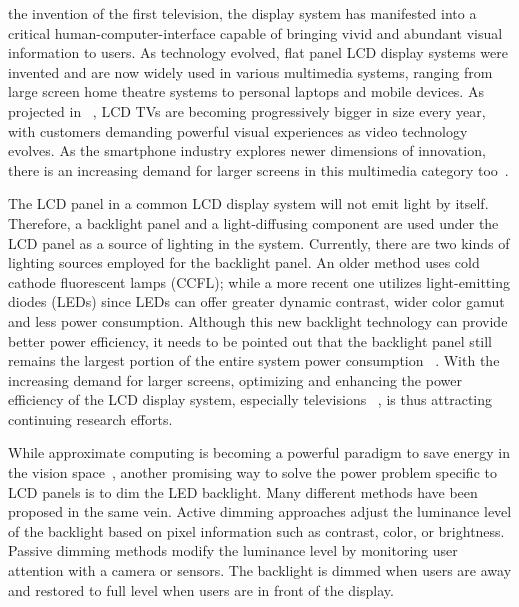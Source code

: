  the invention of the first television, the display system has manifested into a critical human-computer-interface 
capable of bringing vivid and abundant visual information to users. 
As technology evolved, flat panel LCD display systems were invented and are now 
widely used in various multimedia systems, ranging from large screen home theatre systems 
to personal laptops and mobile devices. As projected in ~\cite{lcd_future}, LCD TVs are becoming progressively bigger
in size every year, with customers demanding powerful visual experiences as video technology evolves. As the smartphone industry
explores newer dimensions of innovation, there is an increasing demand for larger screens in this multimedia category too~\cite{iPhone}.

The LCD panel in a common LCD display system will not emit light by itself. Therefore, a backlight panel and a light-diffusing 
component are used under the LCD panel as a source of lighting in the system.
Currently, there are two kinds of lighting sources employed for the backlight panel. 
An older method uses cold cathode fluorescent lamps (CCFL); while a more recent one utilizes 
light-emitting diodes (LEDs) since LEDs can offer greater dynamic contrast, wider color gamut and 
less power consumption. Although this new backlight technology can provide better power efficiency, 
it needs to be pointed out that the backlight panel still remains the largest portion of the entire 
system power consumption ~\cite{Sinofsky}. With the increasing demand for larger screens, 
optimizing and enhancing the power efficiency of the LCD display system, 
especially televisions ~\cite{Samsung}, is thus attracting continuing research efforts.

While approximate computing is becoming a powerful paradigm to save energy in the vision space~\cite{tvlsi2015}, 
another promising way to solve the power problem specific to LCD panels is to dim the LED backlight. Many different methods 
have been proposed in the same vein. Active dimming approaches adjust the luminance level of the backlight 
based on pixel information such as contrast, color, or brightness. Passive dimming methods modify the 
luminance level by monitoring user attention with a camera or sensors. 
The backlight is dimmed when users are away and restored to full level when users are in front of the display.

